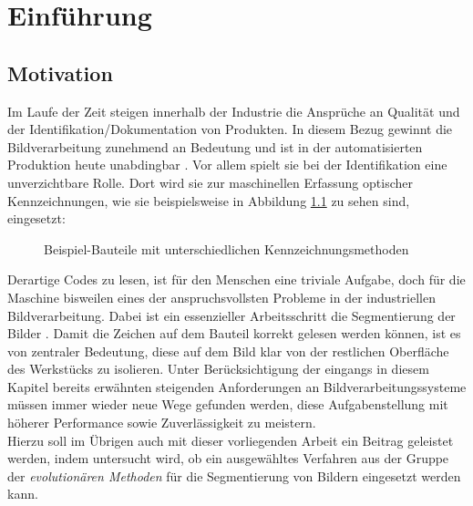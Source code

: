 \chapter{Einführung}
\label{chap:intro}
	
	\section{Motivation}
	\label{sec:motivation}
		Im Laufe der Zeit steigen innerhalb der Industrie die Ansprüche an Qualität und der Identifikation/Dokumentation von Produkten. In diesem Bezug gewinnt die Bildverarbeitung zunehmend an Bedeutung und ist in der automatisierten Produktion heute unabdingbar \cite[S. 1]{indust-imgproc}. 
		Vor allem spielt sie bei der Identifikation eine unverzichtbare Rolle. Dort wird sie zur maschinellen Erfassung optischer Kennzeichnungen, wie sie beispielsweise in Abbildung \ref{fig:example-code} zu sehen sind, eingesetzt:
		\begin{figure}[H]
			\centering
			\quad
			\caption{Beispiel-Bauteile mit unterschiedlichen Kennzeichnungsmethoden}
			\label{fig:example-code}
		\end{figure}
		Derartige Codes zu lesen, ist für den Menschen eine triviale Aufgabe, doch für die Maschine bisweilen eines der anspruchsvollsten Probleme in der industriellen Bildverarbeitung. Dabei ist ein essenzieller Arbeitsschritt die Segmentierung der Bilder \cite[S. 136]{indust-imgproc}. Damit die Zeichen auf dem Bauteil korrekt gelesen werden können, ist es von zentraler Bedeutung, diese auf dem Bild klar von der restlichen Oberfläche des Werkstücks zu isolieren. Unter Berücksichtigung der eingangs in diesem Kapitel bereits erwähnten steigenden Anforderungen an Bildverarbeitungssysteme müssen immer wieder neue Wege gefunden werden, diese Aufgabenstellung mit höherer Performance sowie Zuverlässigkeit zu meistern.\\
		Hierzu soll im Übrigen auch mit dieser vorliegenden Arbeit ein Beitrag geleistet werden, indem untersucht wird, ob ein ausgewähltes Verfahren aus der Gruppe 
		der \textit{evolutionären Methoden} für die Segmentierung von Bildern eingesetzt werden kann. 
		
